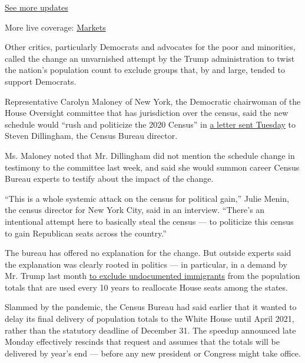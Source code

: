 \href{https://www.nytimes.com/2020/08/04/world/coronavirus-cases.html?action=click\&pgtype=Article\&state=default\&region=MAIN_CONTENT_1\&context=storylines_live_updates}{See
more updates}

More live coverage:
\href{https://www.nytimes.com/live/2020/08/04/business/stock-market-today-coronavirus?action=click\&pgtype=Article\&state=default\&region=MAIN_CONTENT_1\&context=storylines_live_updates}{Markets}

Other critics, particularly Democrats and advocates for the poor and
minorities, called the change an unvarnished attempt by the Trump
administration to twist the nation's population count to exclude groups
that, by and large, tended to support Democrats.

Representative Carolyn Maloney of New York, the Democratic chairwoman of
the House Oversight committee that has jurisdiction over the census,
said the new schedule would ``rush and politicize the 2020 Census'' in
\href{https://oversight.house.gov/sites/democrats.oversight.house.gov/files/2020-08-04.CBM\%20to\%20Dillingham\%20re\%20Transcribed\%20Interviews.pdf}{a
letter sent Tuesday} to Steven Dillingham, the Census Bureau director.

Ms. Maloney noted that Mr. Dillingham did not mention the schedule
change in testimony to the committee last week, and said she would
summon career Census Bureau experts to testify about the impact of the
change.

``This is a whole systemic attack on the census for political gain,''
Julie Menin, the census director for New York City, said in an
interview. ``There's an intentional attempt here to basically steal the
census --- to politicize this census to gain Republican seats across the
country.''

The bureau has offered no explanation for the change. But outside
experts said the explanation was clearly rooted in politics --- in
particular, in a demand by Mr. Trump last month
\href{https://www.nytimes.com/2020/07/21/us/politics/trump-immigrants-census-redistricting.html?searchResultPosition=5}{to
exclude undocumented immigrants} from the population totals that are
used every 10 years to reallocate House seats among the states.

Slammed by the pandemic, the Census Bureau had said earlier that it
wanted to delay its final delivery of population totals to the White
House until April 2021, rather than the statutory deadline of December
31. The speedup announced late Monday effectively rescinds that request
and assumes that the totals will be delivered by year's end --- before
any new president or Congress might take office.

